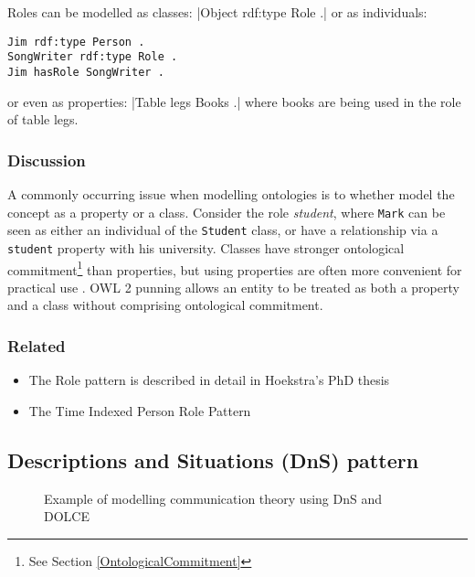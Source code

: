 Roles can be modelled as classes: |Object rdf:type Role .| or as individuals: 
\begin{verbatim}
Jim rdf:type Person .
SongWriter rdf:type Role .
Jim hasRole SongWriter .
\end{verbatim}

\noindent
or even as properties: |Table legs Books .| where books are being used in the role of table legs.

\subsubsection{Discussion}

A commonly occurring issue when modelling ontologies is to whether model the concept as a property or a class. Consider the role \emph{student}, where \texttt{Mark} can be seen as either an individual of the \texttt{Student} class, or have a relationship via a \texttt{student} property with his university. Classes have stronger ontological commitment\footnote{See Section \ref{OntologicalCommitment}} than properties, but using properties are often more convenient for practical use \cite{Hoekstra2010}. \ac{OWL} 2 punning allows an entity to be treated as both a property and a class without comprising ontological commitment.

\subsubsection{Related}

\begin{itemize}
	\item The Role pattern is described in detail in Hoekstra's PhD thesis \cite{Hoekstra2009}
	\item The Time Indexed Person Role Pattern \cite{Gangemi2008}
\end{itemize}




\subsection{Descriptions and Situations (DnS) pattern}

\begin{figure}[bth]
	\centerline{
	}
	\caption{Example of modelling communication theory using \ac{DnS} and \ac{DOLCE}}
	\label{DnSExample}        
\end{figure}

